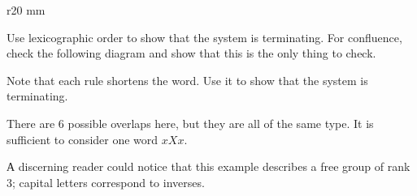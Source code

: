 \begin{wrapfigure}{r}{20 mm}
\vskip-2mm
\centering
{}
\end{wrapfigure}

\parit{\ref{ex:complete:b}}
Use lexicographic order to show that the system is terminating.
For confluence, check the following diagram and show that this is the only thing to check.


\parit{\ref{ex:complete:c}}
Note that each rule shortens the word.
Use it to show that the system is terminating.

There are 6 possible overlaps here, but they are all of the same type.
It is sufficient to consider one word $xXx$.

А discerning reader could notice that this example describes a free group of rank 3;
capital letters correspond to inverses. 

\spell{\end{multicols}}{}
\newpage
